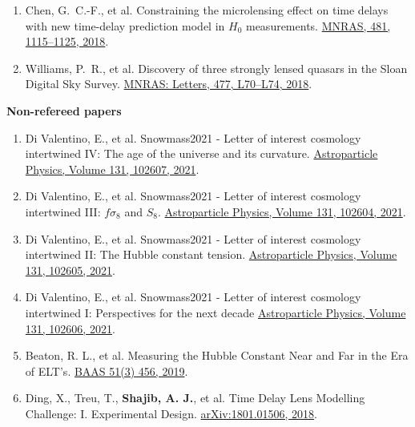\documentclass[margin, line]{res}
\begin{document}
\begin{resume}
\begin{enumerate}
	\item Chen, G.~C.-F., et al. Constraining the microlensing effect on time delays with new time-delay prediction model in $H_0$ measurements. \href{https://doi.org/10.1093/mnras/sty2350}{MNRAS, 481, 1115--1125, 2018}.
 	\item Williams, P.~R., et al. Discovery of three strongly lensed quasars in the Sloan Digital Sky Survey. \href{https://doi.org/10.1093/mnrasl/sly043}{MNRAS: Letters, 477, L70--L74, 2018}.
\end{enumerate}

\textbf{Non-refereed papers}
\begin{enumerate}
	\item Di Valentino, E., et al. Snowmass2021 - Letter of interest cosmology intertwined IV: The age of the universe and its curvature. \href{https://www.sciencedirect.com/science/article/abs/pii/S0927650521000517}{Astroparticle Physics, Volume 131, 102607, 2021}.
	\item Di Valentino, E., et al. Snowmass2021 - Letter of interest cosmology intertwined III: $f\sigma_8$ and $S_8$. \href{https://www.sciencedirect.com/science/article/abs/pii/S0927650521000487}{Astroparticle Physics, Volume 131, 102604, 2021}.
	\item Di Valentino, E., et al. Snowmass2021 - Letter of interest cosmology intertwined II: The Hubble constant tension. \href{https://www.sciencedirect.com/science/article/abs/pii/S0927650521000499}{Astroparticle Physics, Volume 131, 102605, 2021}.
	\item Di Valentino, E., et al. Snowmass2021 - Letter of interest cosmology intertwined I: Perspectives for the next decade \href{https://www.sciencedirect.com/science/article/abs/pii/S0927650521000505}{Astroparticle Physics, Volume 131, 102606, 2021}.
	\item Beaton, R. L., et al. Measuring the Hubble Constant Near and Far in the Era of ELT's. \href{https://ui.adsabs.harvard.edu/abs/2019BAAS...51c.456B/abstract}{BAAS 51(3) 456, 	2019}.
	\item Ding, X., Treu, T., {\bf Shajib, A. J.}, et al. Time Delay Lens Modelling Challenge: I. Experimental Design. \href{https://arxiv.org/abs/1801.01506}{arXiv:1801.01506, 2018}.


\end{enumerate}
\end{resume}
\end{document}
